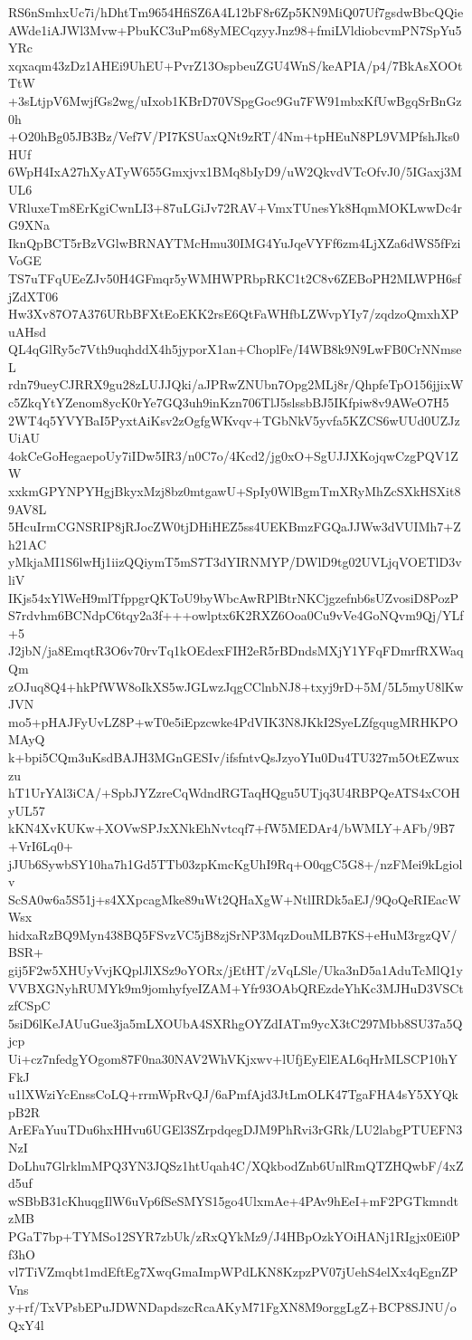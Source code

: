 RS6nSmhxUc7i/hDhtTm9654HfiSZ6A4L12bF8r6Zp5KN9MiQ07Uf7gsdwBbcQQie
AWde1iAJWl3Mvw+PbuKC3uPm68yMECqzyyJnz98+fmiLVldiobcvmPN7SpYu5YRc
xqxaqm43zDz1AHEi9UhEU+PvrZ13OspbeuZGU4WnS/keAPIA/p4/7BkAsXOOtTtW
+3sLtjpV6MwjfGs2wg/uIxob1KBrD70VSpgGoc9Gu7FW91mbxKfUwBgqSrBnGz0h
+O20hBg05JB3Bz/Vef7V/PI7KSUaxQNt9zRT/4Nm+tpHEuN8PL9VMPfshJks0HUf
6WpH4IxA27hXyATyW655Gmxjvx1BMq8bIyD9/uW2QkvdVTcOfvJ0/5IGaxj3MUL6
VRluxeTm8ErKgiCwnLI3+87uLGiJv72RAV+VmxTUnesYk8HqmMOKLwwDc4rG9XNa
IknQpBCT5rBzVGlwBRNAYTMcHmu30IMG4YuJqeVYFf6zm4LjXZa6dWS5fFziVoGE
TS7uTFqUEeZJv50H4GFmqr5yWMHWPRbpRKC1t2C8v6ZEBoPH2MLWPH6sfjZdXT06
Hw3Xv87O7A376URbBFXtEoEKK2rsE6QtFaWHfbLZWvpYIy7/zqdzoQmxhXPuAHsd
QL4qGlRy5c7Vth9uqhddX4h5jyporX1an+ChoplFe/I4WB8k9N9LwFB0CrNNmseL
rdn79ueyCJRRX9gu28zLUJJQki/aJPRwZNUbn7Opg2MLj8r/QhpfeTpO156jjixW
c5ZkqYtYZenom8ycK0rYe7GQ3uh9inKzn706TlJ5slssbBJ5IKfpiw8v9AWeO7H5
2WT4q5YVYBaI5PyxtAiKsv2zOgfgWKvqv+TGbNkV5yvfa5KZCS6wUUd0UZJzUiAU
4okCeGoHegaepoUy7iIDw5IR3/n0C7o/4Kcd2/jg0xO+SgUJJXKojqwCzgPQV1ZW
xxkmGPYNPYHgjBkyxMzj8bz0mtgawU+SpIy0WlBgmTmXRyMhZcSXkHSXit89AV8L
5HcuIrmCGNSRIP8jRJocZW0tjDHiHEZ5ss4UEKBmzFGQaJJWw3dVUIMh7+Zh21AC
yMkjaMI1S6lwHj1iizQQiymT5mS7T3dYIRNMYP/DWlD9tg02UVLjqVOETlD3vliV
IKjs54xYlWeH9mlTfppgrQKToU9byWbcAwRPlBtrNKCjgzefnb6sUZvosiD8PozP
S7rdvhm6BCNdpC6tqy2a3f+++owlptx6K2RXZ6Ooa0Cu9vVe4GoNQvm9Qj/YLf+5
J2jbN/ja8EmqtR3O6v70rvTq1kOEdexFIH2eR5rBDndsMXjY1YFqFDmrfRXWaqQm
zOJuq8Q4+hkPfWW8oIkXS5wJGLwzJqgCClnbNJ8+txyj9rD+5M/5L5myU8lKwJVN
mo5+pHAJFyUvLZ8P+wT0e5iEpzcwke4PdVIK3N8JKkI2SyeLZfgqugMRHKPOMAyQ
k+bpi5CQm3uKsdBAJH3MGnGESIv/ifsfntvQsJzyoYIu0Du4TU327m5OtEZwuxzu
hT1UrYAl3iCA/+SpbJYZzreCqWdndRGTaqHQgu5UTjq3U4RBPQeATS4xCOHyUL57
kKN4XvKUKw+XOVwSPJxXNkEhNvtcqf7+fW5MEDAr4/bWMLY+AFb/9B7+VrI6Lq0+
jJUb6SywbSY10ha7h1Gd5TTb03zpKmcKgUhI9Rq+O0qgC5G8+/nzFMei9kLgiolv
ScSA0w6a5S51j+s4XXpcagMke89uWt2QHaXgW+NtlIRDk5aEJ/9QoQeRIEacWWsx
hidxaRzBQ9Myn438BQ5FSvzVC5jB8zjSrNP3MqzDouMLB7KS+eHuM3rgzQV/BSR+
gij5F2w5XHUyVvjKQplJlXSz9oYORx/jEtHT/zVqLSle/Uka3nD5a1AduTcMlQ1y
VVBXGNyhRUMYk9m9jomhyfyeIZAM+Yfr93OAbQREzdeYhKc3MJHuD3VSCtzfCSpC
5siD6lKeJAUuGue3ja5mLXOUbA4SXRhgOYZdIATm9ycX3tC297Mbb8SU37a5Qjcp
Ui+cz7nfedgYOgom87F0na30NAV2WhVKjxwv+lUfjEyElEAL6qHrMLSCP10hYFkJ
u1lXWziYcEnssCoLQ+rrmWpRvQJ/6aPmfAjd3JtLmOLK47TgaFHA4sY5XYQkpB2R
ArEFaYuuTDu6hxHHvu6UGEl3SZrpdqegDJM9PhRvi3rGRk/LU2labgPTUEFN3NzI
DoLhu7GlrklmMPQ3YN3JQSz1htUqah4C/XQkbodZnb6UnlRmQTZHQwbF/4xZd5uf
wSBbB31cKhuqgIlW6uVp6fSeSMYS15go4UlxmAe+4PAv9hEeI+mF2PGTkmndtzMB
PGaT7bp+TYMSo12SYR7zbUk/zRxQYkMz9/J4HBpOzkYOiHANj1RIgjx0Ei0Pf3hO
vl7TiVZmqbt1mdEftEg7XwqGmaImpWPdLKN8KzpzPV07jUehS4elXx4qEgnZPVns
y+rf/TxVPsbEPuJDWNDapdszcRcaAKyM71FgXN8M9orggLgZ+BCP8SJNU/oQxY4l

